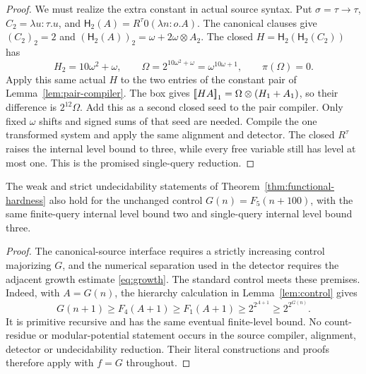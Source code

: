 \begin{proof}
We must realize the extra constant in actual source syntax.  Put
$\sigma=\tau\to\tau$, $C_2=\lambda u:\tau.u$, and
$\mathsf H_2(A)=R^\tau0(\lambda n:o.A)$.  The canonical clauses give
$(C_2)_2=2$ and $(\mathsf H_2(A))_2=\omega+2\omega\otimes A_2$.
The closed $H=\mathsf H_2(\mathsf H_2(C_2))$ has
\[
 H_2=10\omega^2+\omega,
 \qquad\Omega=2^{10\omega^2+\omega}=\omega^{10\omega+1},
 \qquad\pi(\Omega)=0.
\]
Apply this same actual $H$ to the two entries of the constant pair of
Lemma~\ref{lem:pair-compiler}.  The box gives
$\mathopen{[\![}HA\mathclose{]\!]}_1=\Omega\otimes(H_1+A_1)$, so their difference is
$2^{12}\Omega$.  Add this as a second closed seed to the pair compiler.
Only fixed $\omega$ shifts and signed sums of that seed are needed.
Compile the one transformed system and apply the same alignment and detector.
The closed $R^\tau$ raises the internal level bound to three, while every
free variable still has level at most one.  This is the promised single-query
reduction.
\end{proof}

\begin{corollary}
\label{cor:standard-functional-hardness}
The weak and strict undecidability statements of
Theorem~\ref{thm:functional-hardness} also hold for the unchanged control
\(G(n)=F_5(n+100)\), with the same finite-query internal level bound two
and single-query internal level bound three.
\end{corollary}
\begin{proof}
The canonical-source interface requires a strictly increasing control
majorizing \(G\), and the numerical separation used in the detector
requires the adjacent growth estimate \eqref{eq:growth}. The standard
control meets these premises. Indeed, with \(A=G(n)\), the hierarchy
calculation in Lemma~\ref{lem:control} gives
\[
 G(n+1)\ge F_4(A+1)\ge F_1(A+1)
             \ge 2^{2^{A+1}}\ge2^{2^{G(n)}}.
\]
It is primitive recursive and has the same eventual finite-level bound.
No count-residue or modular-potential statement occurs in the source
compiler, alignment, detector or undecidability reduction. Their literal
constructions and proofs therefore apply with \(f=G\) throughout.
\end{proof}

